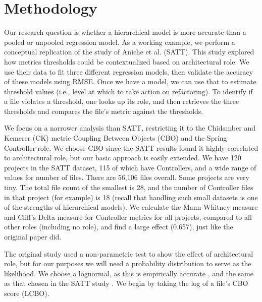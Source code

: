\documentclass[sigconf,natbib=false]{acmart}
\begin{document}


\section{Methodology}
Our research question is whether a hierarchical model is more accurate than a
pooled or unpooled regression model. As a working example, we perform a
conceptual replication of the study of Aniche et al. \cite{Aniche2016} (SATT).
This study explored how metrics thresholds could be contextualized based on
architectural role. We use their data to fit three different regression models,
then validate the accuracy of these models using RMSE. Once we have a model, we
can use that to estimate threshold values (i.e., level at which to take action
on refactoring). To identify if a file violates a threshold, one looks up its
role, and then retrieves the three thresholds and compares the file's metric
against the thresholds.

We focus on a narrower analysis than SATT, restricting it to the Chidamber and
Kemerer (CK) metric Coupling Between Objects (CBO) \cite{Chidamber_1991} and the
Spring Controller role. We choose CBO since the SATT results found it highly
correlated to architectural role, but our basic approach is easily extended. We
have 120 projects in the SATT dataset, 115 of which have Controllers, and a wide
range of values for number of files. There are 56,106 files overall. Some
projects are very tiny. The total file count of the smallest is 28, and the
number of Controller files in that project (for example) is 18 (recall that
handling such small datasets is one of the strengths of hierarchical models). We
calculate the Mann-Whitney measure and Cliff's Delta measure for Controller
metrics for all projects, compared to all other roles (including no role), and
find a large effect (0.657), just like the original paper did. 

The original study used a non-parametric test to show the effect of
architectural role, but for our purposes we will need a probability distribution
to serve as the likelihood. 
We choose a lognormal, as this is empirically accurate \cite{Herraiz2012}, and the same as that
chosen in  the SATT study \cite{Aniche2016}. We begin by taking the log of a
file's CBO score (LCBO).
\end{document}
